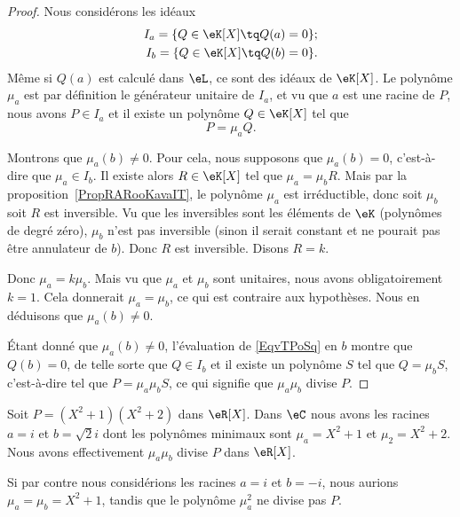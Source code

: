 \begin{proof}
    Nous considérons les idéaux
    \begin{subequations}
        \begin{align}
            I_a=\{ Q\in \eK[X]\tq Q(a)=0 \};\\
            I_b=\{ Q\in \eK[X]\tq Q(b)=0 \}.
        \end{align}
    \end{subequations}
    Même si \( Q(a)\) est calculé dans \( \eL\), ce sont des idéaux de \( \eK[X]\). Le polynôme \( \mu_a\) est par définition le générateur unitaire de \( I_a\), et vu que \( a\) est une racine de \( P\), nous avons \( P\in I_a\) et il existe un polynôme \( Q\in \eK[X]\) tel que
    \begin{equation}    \label{EqvTPoSq}
        P=\mu_aQ.
    \end{equation}

    Montrons que \( \mu_a(b)\neq 0\). Pour cela, nous  supposons que \( \mu_a(b)=0\), c'est-à-dire que \( \mu_a\in I_b\). Il existe alors \( R\in \eK[X]\) tel que \( \mu_a=\mu_bR\). Mais par la proposition~\ref{PropRARooKavaIT}, le polynôme \( \mu_a\) est irréductible, donc soit \( \mu_b\) soit \( R\) est inversible. Vu que les inversibles sont les éléments de \( \eK\) (polynômes de degré zéro), \( \mu_b\) n'est pas inversible (sinon il serait constant et ne pourait pas être annulateur de \( b\)). Donc \( R\) est inversible. Disons \( R=k\).

    Donc \( \mu_a=k\mu_b\). Mais vu que \( \mu_a\) et \( \mu_b\) sont unitaires, nous avons obligatoirement \( k=1\). Cela donnerait \( \mu_a=\mu_b\), ce qui est contraire aux hypothèses. Nous en déduisons que \( \mu_a(b)\neq 0\).

    Étant donné que \( \mu_a(b)\neq 0\), l'évaluation de \eqref{EqvTPoSq} en \( b\) montre que \( Q(b)=0\), de telle sorte que \( Q\in I_b\) et il existe un polynôme \( S\) tel que \( Q=\mu_bS\), c'est-à-dire tel que \( P=\mu_a\mu_bS\), ce qui signifie que \( \mu_a\mu_b\) divise \( P\).
\end{proof}

\begin{example}
    Soit \( P=(X^2+1)(X^2+2)\) dans \( \eR[X]\). Dans \( \eC\) nous avons les racines \( a=i\) et \( b=\sqrt{2}i\) dont les polynômes minimaux sont \( \mu_a=X^2+1\) et \( \mu_2=X^2+2\). Nous avons effectivement \( \mu_a\mu_b\) divise \( P\) dans \( \eR[X]\).

    Si par contre nous considérions les racines \( a=i\) et \( b=-i\), nous aurions \( \mu_a=\mu_b=X^2+1\), tandis que le polynôme \( \mu_a^2\) ne divise pas \( P\).
\end{example}

